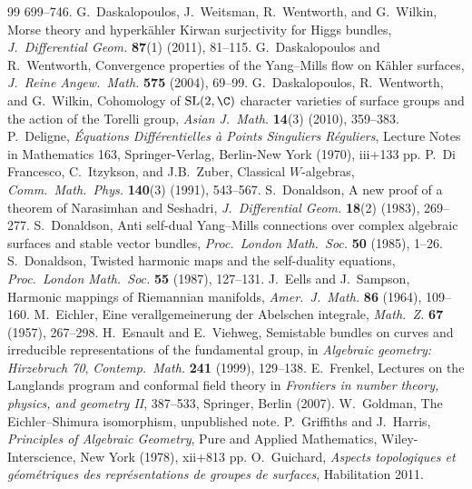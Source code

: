 \begin{thebibliography}{99}
699--746.
 G.~Daskalopoulos, J.~Weitsman, R.~Wentworth, and G.~Wilkin,
Morse theory and hyperk\"{a}hler Kirwan surjectivity for Higgs bundles,
\emph{J.\ Differential Geom.} \textbf{87}(1) (2011), 81--115.
 G.~Daskalopoulos and R.~Wentworth, Convergence
properties of the Yang--Mills flow on K\"{a}hler surfaces, \emph{J.\ Reine Angew.\ Math.}
\textbf{575} (2004), 69--99.
 G.~Daskalopoulos, R.~Wentworth, and G.~Wilkin, Cohomology of
$\mathrm{SL}(2,\C)$ character varieties of surface groups and the action of the Torelli
group, \emph{Asian J.\ Math.} \textbf{14}(3) (2010), 359--383.
 P.~Deligne, \emph{\'Equations Diff\'{e}rentielles \`{a} Points
Singuliers R\'{e}guliers}, Lecture Notes in Mathematics 163, Springer-Verlag,
Berlin-New York (1970), iii+133 pp.
 P.~Di Francesco, C.~Itzykson, and J.B.~Zuber, Classical
$W$-algebras, \emph{Comm.\ Math.\ Phys.} \textbf{140}(3) (1991), 543--567.
 S.~Donaldson, A new proof of a theorem of Narasimhan and
Seshadri, \emph{J.\ Differential Geom.} \textbf{18}(2) (1983), 269--277.
 S.~Donaldson, Anti self-dual Yang--Mills connections over
complex algebraic surfaces and stable vector bundles, \emph{Proc.\ London Math.\ Soc.}
\textbf{50} (1985), 1--26.
 S.~Donaldson, Twisted harmonic maps and the self-duality
equations, \emph{Proc.\ London Math.\ Soc.} \textbf{55} (1987), 127--131.
 J.~Eells and J.~Sampson, Harmonic mappings of Riemannian
manifolds, \emph{Amer.\ J.\ Math.} \textbf{86} (1964), 109--160.
 M.~Eichler, Eine verallgemeinerung der Abelschen integrale,
\emph{Math.\ Z.} \textbf{67} (1957), 267--298.
 H.~Esnault and E.~Viehweg, Semistable bundles on curves and
irreducible representations of the fundamental group, in \emph{Algebraic geometry:
Hirzebruch 70}, \emph{Contemp.\ Math.} \textbf{241} (1999), 129--138.
 E.~Frenkel, Lectures on the Langlands program and conformal field
theory in \emph{Frontiers in number theory, physics, and geometry II}, 387--533,
Springer, Berlin (2007).
 W.~Goldman, The Eichler--Shimura isomorphism, unpublished note.
 P.~Griffiths and J.~Harris, \emph{Principles of Algebraic
Geometry}, Pure and Applied Mathematics, Wiley-Interscience, New York (1978), xii+813 pp.
 O.~Guichard, \emph{Aspects topologiques et g\'{e}om\'{e}triques
des repr\'{e}sentations de groupes de surfaces}, Habilitation 2011.

\end{thebibliography}
